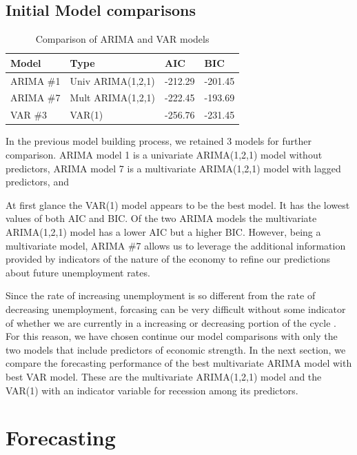 \documentclass[twoside,twocolumn]{article}
\begin{document}
\subsection{Initial Model comparisons}

\begin{table}[H]
\centering
\caption{Comparison of ARIMA and VAR models}
\begin{tabular}{llll}
  \hline
Model & Type & AIC & BIC \\ 
  \hline
ARIMA \#1 &Univ ARIMA(1,2,1) &   -212.29 & -201.45  \\ 
ARIMA \#7 & Mult ARIMA(1,2,1)  & -222.45 & -193.69   \\ 
VAR \#3 & VAR(1) & -256.76 & -231.45 \\ 
   \hline
\end{tabular}
\end{table}


In the previous model building process, we retained 3 models for further comparison. ARIMA model 1 is a univariate ARIMA(1,2,1) model without predictors, ARIMA model 7 is a multivariate ARIMA(1,2,1) model with lagged predictors, and 

At first glance the VAR(1) model appears to be the best model.  It has the lowest values of both AIC and BIC.  Of the two ARIMA models the multivariate ARIMA(1,2,1) model has a lower AIC but a higher BIC. However, being a multivariate model, ARIMA \#7 allows us to leverage the additional information provided by indicators of the nature of the economy to refine our predictions about future unemployment rates. 

Since the rate of increasing unemployment is so different from the rate of decreasing unemployment, forcasing can be very difficult without some indicator of whether we are currently in a increasing or decreasing portion of the cycle \citep{Montgomery1998}. For this reason, we have chosen continue our model comparisons with only the two models that include predictors of economic strength. In the next section, we compare the forecasting performance of the best multivariate ARIMA model with best VAR model. These are the multivariate ARIMA(1,2,1) model and the VAR(1) with an indicator variable for recession among its predictors.


\section{Forecasting}
\end{document}
